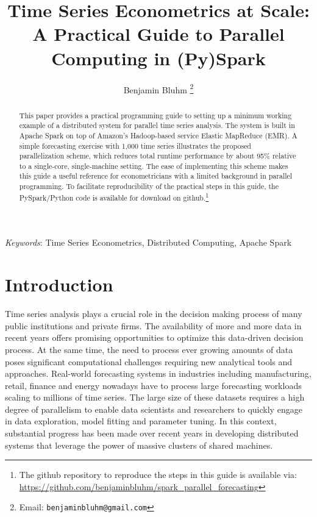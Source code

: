 \documentclass[11pt]{article}
\begin{document}
\title{Time Series Econometrics at Scale: \linebreak A Practical Guide to Parallel Computing in (Py)Spark}
\author{Benjamin Bluhm%
  \thanks{Email: \texttt{benjaminbluhm@gmail.com}}}
\maketitle

\begin{abstract}
This paper provides a practical programming guide to setting up a minimum working example of a distributed system for parallel time series analysis. The system is built in Apache Spark on top of Amazon's Hadoop-based service Elastic MapReduce (EMR). A simple forecasting exercise with 1,000 time series illustrates the proposed parallelization scheme, which reduces total runtime performance by about 95\% relative to a single-core, single-machine setting. The ease of implementing this scheme makes this guide a useful reference for econometricians with a limited background in parallel programming. To facilitate reproducibility of the practical steps in this guide, the PySpark/Python code is available for download on github.\footnote{The github repository to reproduce the steps in this guide is available via: \url{https://github.com/benjaminbluhm/spark\_parallel\_forecasting}}
\end{abstract}

\emph{Keywords}: Time Series Econometrics, Distributed Computing, Apache Spark

\section{Introduction}

Time series analysis plays a crucial role in the decision making process of many public institutions and private firms. The availability of more and more data in recent years offers promising opportunities to optimize this data-driven decision process. At the same time, the need to process ever growing amounts of data poses significant computational challenges requiring new analytical tools and approaches. Real-world forecasting systems in industries including manufacturing, retail, finance and energy nowadays have to process large forecasting workloads scaling to millions of time series. The large size of these datasets requires a high degree of parallelism to enable data scientists and researchers to quickly engage in data exploration, model fitting and parameter tuning. In this context, substantial progress has been made over recent years in developing distributed systems that leverage the power of massive clusters of shared machines. 
\end{document}
